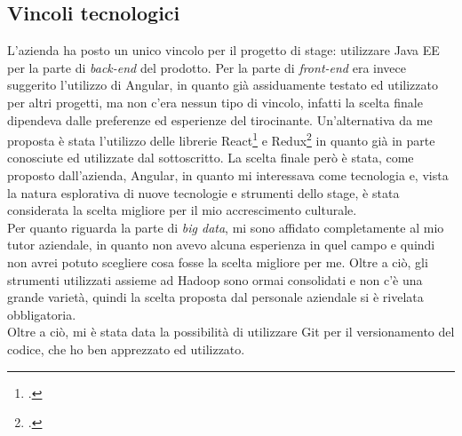 \subsection{Vincoli tecnologici}
L'azienda ha posto un unico vincolo per il progetto di stage: utilizzare Java EE per la parte di \textit{back-end} del prodotto. Per la parte di \textit{front-end} era invece suggerito l'utilizzo di Angular, in quanto già assiduamente testato ed utilizzato per altri progetti, ma non c'era nessun tipo di vincolo, infatti la scelta finale dipendeva dalle preferenze ed esperienze del tirocinante. Un'alternativa da me proposta è stata l'utilizzo delle librerie React\footcite{https://reactjs.org/} e Redux\footcite{https://redux.js.org/} in quanto già in parte conosciute ed utilizzate dal sottoscritto. La scelta finale però è stata, come proposto dall'azienda, Angular, in  quanto mi interessava come tecnologia e, vista la natura esplorativa di nuove tecnologie e strumenti dello stage, è stata considerata la scelta migliore per il mio accrescimento culturale. \\
Per quanto riguarda la parte di \textit{big data}, mi sono affidato completamente al mio tutor aziendale, in quanto non avevo alcuna esperienza in quel campo e quindi non avrei potuto scegliere cosa fosse la scelta migliore per me. Oltre a ciò, gli strumenti utilizzati assieme ad Hadoop sono ormai consolidati e non c'è una grande varietà, quindi la scelta proposta dal personale aziendale si è rivelata obbligatoria. \\
Oltre a ciò, mi è stata data la possibilità di utilizzare \gls{Git} per il versionamento del codice, che ho ben apprezzato ed utilizzato.